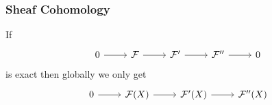 \documentclass{beamer}
\begin{document}
\begin{frame}
    \frametitle{Sheaf Cohomology}

    If
    \begin{equation*}
        \begin{tikzcd}
            0 \rar & \mcF \rar & \mcF' \rar & \mcF'' \rar & 0
        \end{tikzcd}
    \end{equation*}
    is exact then globally we only get
    \begin{equation*}
        \begin{tikzcd}
            0 \rar & \mcF(X) \rar & \mcF'(X) \rar & \mcF''(X)
        \end{tikzcd}
    \end{equation*}
    \pause

    \begin{definition}

    \end{definition}
\end{frame}
\end{document}
